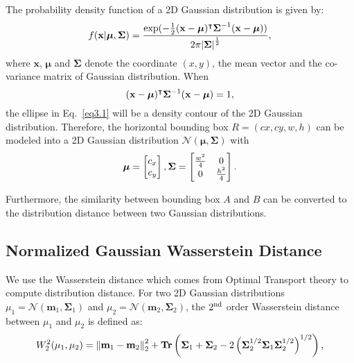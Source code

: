 \documentclass{article}
\newcommand{\equspace}{3.0pt}
\begin{document}
The probability density function of a 2D Gaussian distribution is given by:
\begin{equation}
    \setlength{\abovedisplayskip}{\equspace}
	\setlength{\belowdisplayskip}{\equspace}
   f(\mathbf{x}|\boldsymbol{\mu}, \boldsymbol{\Sigma}) = \frac{ \exp (-\frac{1}{2} (\mathbf{x} - \boldsymbol{\mu})^\intercal \boldsymbol{\Sigma}^{-1} (\mathbf{x} - \boldsymbol{\mu}))}{ 2\pi {|\boldsymbol{\Sigma}|}^{\frac{1}{2}}},
   \label{eq3.2}
\end{equation}
where $\mathbf{x}$, $\boldsymbol{\mu}$ and $\mathbf{\Sigma}$ denote the coordinate $(x, y)$, the mean vector and the co-variance matrix of Gaussian distribution. When
\begin{equation}
    \setlength{\abovedisplayskip}{\equspace}
	\setlength{\belowdisplayskip}{\equspace}
    (\mathbf{x}-\boldsymbol{\mu})^\intercal \mathbf{\Sigma} ^{-1}(\mathbf{x}-\boldsymbol{\mu})=1,
    \label{eq3.4}
\end{equation}
the ellipse in Eq.~\ref{eq3.1} will be a density contour of the 2D Gaussian distribution. Therefore, the horizontal bounding box $R=(cx,cy,w,h)$ can be modeled into a 2D Gaussian distribution $\mathcal{N}(\boldsymbol{\mu},\boldsymbol{\Sigma})$ with 
\begin{equation}
    \setlength{\abovedisplayskip}{\equspace}
	\setlength{\belowdisplayskip}{\equspace}
    \boldsymbol{\mu}=\begin{bmatrix}
        c_x\\ c_y
    \end{bmatrix}
    ,
    \mathbf{\Sigma }=\begin{bmatrix}
    \frac{w^2}{4} & 0 \\ 
    0 & \frac{h^2}{4}
    \end{bmatrix}.
    \label{eq3.3}
\end{equation}

Furthermore, the similarity between bounding box $A$ and $B$ can be converted to the distribution distance between two Gaussian distributions.



\subsection{Normalized Gaussian Wasserstein Distance}
\label{sec::nwd_definition}

We use the Wasserstein distance which comes from Optimal Transport theory to compute distribution distance. For two 2D Gaussian distributions $\mu_{1}=\mathcal{N}(\boldsymbol{m}_{1}, \boldsymbol{\Sigma}_{1})$ and $\mu_{2}=\mathcal{N}(\boldsymbol{m}_{2}, \boldsymbol{\Sigma}_{2})$, the $2^{\rm nd}$ order Wasserstein distance between $\mu_{1}$ and $\mu_{2}$ is defined as:
\begin{equation}
    \setlength{\abovedisplayskip}{\equspace}
	\setlength{\belowdisplayskip}{\equspace}
    W_{2}^{2}(\mu_1, \mu_2)=\left\|\mathbf{m}_{1}-\mathbf{m}_{2}\right\|_{2}^{2}+\textbf{Tr} \left(\mathbf{\Sigma}_{1}+\mathbf{\Sigma}_{2}-2\left(\mathbf{\Sigma}_{2}^{1 / 2} \mathbf{\Sigma}_{1} \mathbf{\Sigma}_{2}^{1 / 2}\right)^{1 / 2}\right),
    \label{eq3.8}
\end{equation}
\end{document}
